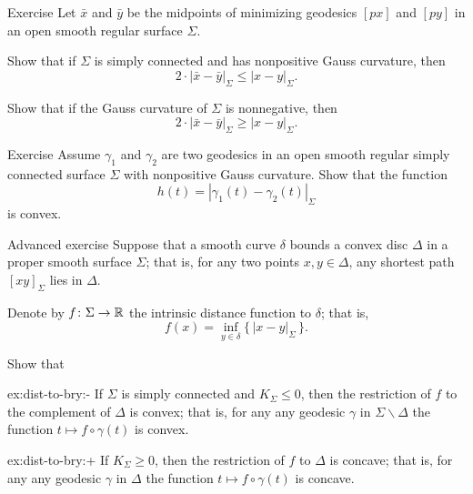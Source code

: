 \begin{thm}{Exercise}\label{ex:midpoints}
Let $\bar x$ and $\bar y$ be the midpoints of minimizing geodesics $[px]$ and $[py]$ in an open smooth regular surface $\Sigma$.

\begin{subthm}{}
 Show that if $\Sigma$ is simply connected and has nonpositive Gauss curvature, then 
 \[2\cdot |\bar x-\bar y|_\Sigma\le |x-y|_\Sigma.\]
 \end{subthm}
 
\begin{subthm}{} Show that if the Gauss curvature of $\Sigma$ is nonnegative, then 
 \[2\cdot |\bar x-\bar y|_\Sigma\ge |x-y|_\Sigma.\]
\end{subthm}

\end{thm}

\begin{thm}{Exercise}\label{ex:convex-dist}
Assume $\gamma_1$ and $\gamma_2$ are two geodesics in an open smooth regular simply connected surface $\Sigma$ with nonpositive Gauss curvature.
Show that the function
\[h(t)=|\gamma_1(t)-\gamma_2(t)|_\Sigma\]
is convex.
\end{thm}

\begin{thm}{Advanced exercise}\label{ex:dist-to-bry}
Suppose that a smooth curve $\delta$ bounds a convex disc $\Delta$ in a proper smooth surface $\Sigma$;
that is, for any two points $x,y\in\Delta$, any shortest path $[xy]_\Sigma$ lies in $\Delta$.

Denote by $f\colon\Sigma\to\mathbb{R}$ the intrinsic distance function to $\delta$;
that is, 
\[f(x)=\inf_{y\in\delta}\{\,|x-y|_\Sigma\,\}.\]

Show that

\begin{subthm}{ex:dist-to-bry:-}
If $\Sigma$ is simply connected and $K_\Sigma\le 0$, then the restriction of $f$ to the complement of $\Delta$ is convex;
that is, for any any geodesic $\gamma$ in $\Sigma\backslash\Delta$ the function $t\mapsto f\circ\gamma(t)$ is convex.
\end{subthm}

\begin{subthm}{ex:dist-to-bry:+}
If $K_\Sigma\ge 0$, then the restriction of $f$ to $\Delta$ is concave;
that is, for any any geodesic $\gamma$ in $\Delta$ the function $t\mapsto f\circ\gamma(t)$ is concave.
\end{subthm}

\end{thm}

